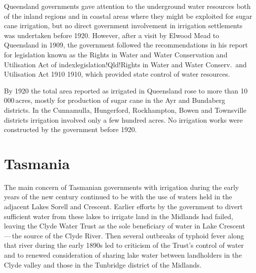 Queensland governments gave attention to the underground water
resour\-ces both of the inland regions and in coastal areas where they
might be exploited for sugar cane irrigation, but no direct government
involvement in irrigation settlements was undertaken before 1920.
However, after a visit by Elwood Mead  to Queensland
in 1909, the government followed the recommendations in his report for
legislation known as the Rights in Water and Water Conservation and
Utilisation Act of index{legislation!Qld!Rights in Water and Water
Conserv.\ and Utilisation Act 1910} 1910, which provided state control
of water resources.

By 1920 the total area reported as irrigated in Queensland rose to
more than 10\,000\,acres, mostly for production of sugar cane in the
Ayr and Bundaberg districts.  In the Cunnamulla, Hungerford,
Rockhampton, Bowen and Townsville districts irrigation involved only a
few hundred acres.  No irrigation works were constructed by the
government before 1920.

\section*{Tasmania}

The main concern of Tasmanian governments with irrigation during the
early years of the new century continued to be with the use of waters
held in the adjacent Lakes Sorell  and Crescent.
 Earlier efforts by the government to divert
sufficient water from these lakes to irrigate land in the Midlands had
failed, leaving the Clyde Water Trust as the sole beneficiary of water
in Lake Crescent\,---\,the source of the Clyde
River.  Then several outbreaks of typhoid fever
along that river during the early 1890s led to criticism of the
Trust's control of water and to renewed consideration of sharing lake
water between landholders in the Clyde valley and those in the
Tunbridge district of the Midlands.

